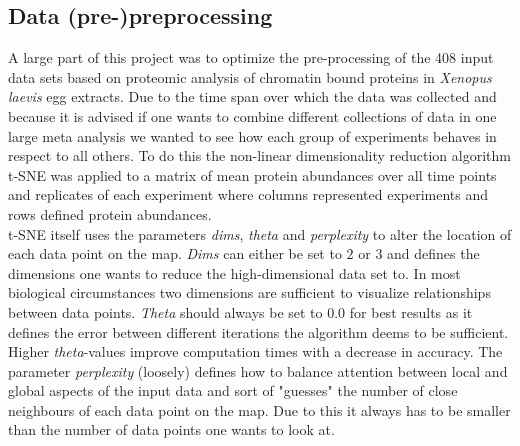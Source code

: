 \subsection{Data (pre-)preprocessing}
\label{sec:processing}
A large part of this project was to optimize the pre-processing of the 408 input data sets based on proteomic analysis of chromatin bound proteins in \textit{Xenopus laevis} egg extracts. Due to the time span over which the data was collected and because it is advised if one wants to combine different collections of data in one large meta analysis we wanted to see how each group of experiments behaves in respect to all others. To do this the non-linear dimensionality reduction algorithm t-SNE was applied to a matrix of mean protein abundances over all time points and replicates of each experiment where columns represented experiments and rows defined protein abundances.\\ t-SNE itself uses the parameters \textit{dims}, \textit{theta} and \textit{perplexity} to alter the location of each data point on the map. \textit{Dims} can either be set to $2$ or $3$ and defines the dimensions one wants to reduce the high-dimensional data set to. In most biological circumstances two dimensions are sufficient to visualize relationships between data points. \textit{Theta} should always be set to $0.0$ for best results as it defines the error between different iterations the algorithm deems to be sufficient. Higher \textit{theta}-values improve computation times with a decrease in accuracy. The parameter \textit{perplexity} (loosely) defines how to balance  attention between local and global aspects of the input data and sort of "guesses" the number of close neighbours of each data point on the map. Due to this it always has to be smaller than the number of data points one wants to look at.\\
